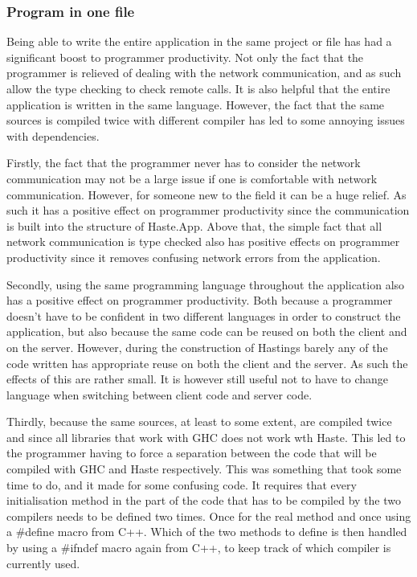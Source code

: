 \documentclass[a4paper]{article}
\begin{document}
\subsubsection{Program in one file}
Being able to write the entire application in the same project or file has had a significant boost to programmer productivity. Not only the fact that the programmer is relieved of dealing with the network communication, and as such allow the type checking to check remote calls. It is also helpful that the entire application is written in the same language. However, the fact that the same sources is compiled twice with different compiler has led to some annoying issues with dependencies.

Firstly, the fact that the programmer never has to consider the network communication may not be a large issue if one is comfortable with network communication. However, for someone new to the field it can be a huge relief. As such it has a positive effect on programmer productivity since the communication is built into the structure of Haste.App. Above that, the simple fact that all network communication is type checked also has positive effects on programmer productivity since it removes confusing network errors from the application.

Secondly, using the same programming language throughout the application also has a positive effect on programmer productivity. Both because a programmer doesn't have to be confident in two different languages in order to construct the application, but also because the same code can be reused on both the client and on the server. However, during the construction of Hastings barely any of the code written has appropriate reuse on both the client and the server. As such the effects of this are rather small. It is however still useful not to have to change language when switching between client code and server code.

Thirdly, because the same sources, at least to some extent, are compiled twice and since all libraries that work with GHC does not work wth Haste. This led to the programmer having to force a separation between the code that will be compiled with GHC and Haste respectively. This was something that took some time to do, and it made for some confusing code. It requires that every initialisation method in the part of the code that has to be compiled by the two compilers needs to be defined two times. Once for the real method and once using a \#define macro from C++. Which of the two methods to define is then handled by using a \#ifndef macro again from C++, to keep track of which compiler is currently used. 
\end{document}
